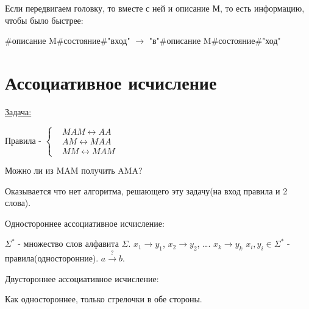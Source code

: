 Если передвигаем головку, то вместе с ней и описание М, то есть информацию, чтобы было быстрее:

\#описание M\#состояние\#"вход" $\rightarrow$ "в"\#описание M\#состояние\#"ход"

\section{Ассоциативное исчисление}
\underline{Задача:}

Правила - $\left\{
	\begin{aligned}
	&MAM \longleftrightarrow AA \\
	&AM \longleftrightarrow MAA \\
	&MM \longleftrightarrow MAM 
	\end{aligned}
\right.$

Можно ли из MAM получить AMA? 

Оказывается что нет алгоритма, решающего эту задачу(на вход правила и 2 слова).

\begin{Def}
	Одностороннее ассоциативное исчисление:
	
	$\Sigma^{*}$ - множество слов алфавита $\Sigma$. $x_1 \rightarrow y_1$, $x_2 \rightarrow y_2$, \dots. $x_k \rightarrow y_k$
	$x_i, y_i \in \Sigma^{*}$ - правила(односторонние). $a \xrightarrow{?} b$.

    Двустороннее ассоциативное исчисление:

    Как одностороннее, только стрелочки в обе стороны.
\end{Def}

